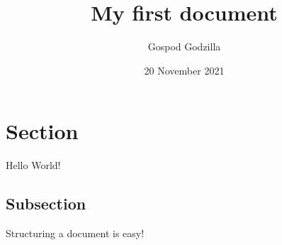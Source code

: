 \documentclass{article}
\title{My first document}
\date{20 November 2021}
\author{Gospod Godzilla}
\begin{document}
    \maketitle
    \newpage
    \section{Section}
    Hello World!
    \subsection{Subsection}
    Structuring a document is easy!
  
\end{document}
